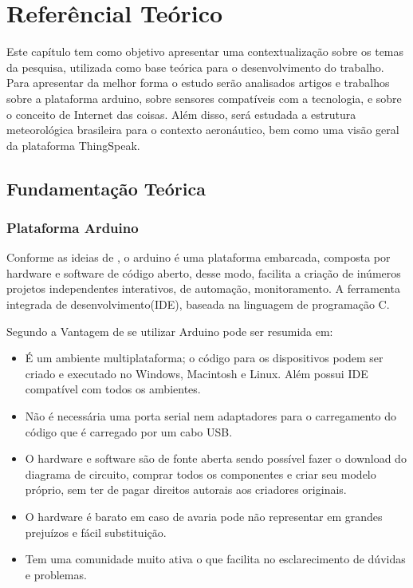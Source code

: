 \chapter{Referêncial Teórico} \label{RevisaoBibliografica}

Este capítulo tem como objetivo apresentar uma contextualização sobre os temas da pesquisa, utilizada como base teórica para o desenvolvimento do trabalho. Para apresentar da melhor forma o estudo serão analisados artigos e trabalhos sobre a plataforma arduino, sobre sensores compatíveis com a tecnologia, e sobre o conceito de Internet das coisas. Além disso, será estudada a estrutura meteorológica brasileira para o contexto aeronáutico, bem como uma visão geral da plataforma ThingSpeak.

\section{Fundamentação Teórica}

\subsection{Plataforma Arduino}

Conforme as ideias de \cite{mcrobertssao}, o arduino é uma plataforma embarcada, composta por hardware e software de código aberto, desse modo, facilita a criação de inúmeros projetos independentes interativos, de automação, monitoramento. A ferramenta integrada de desenvolvimento(IDE), baseada na linguagem de programação C. 

Segundo \cite{banzi2011primeiros} a Vantagem de se utilizar Arduino pode ser resumida em:
\begin{itemize} 
    \item É um ambiente multiplataforma; o código para os dispositivos podem ser criado e executado no Windows, Macintosh e Linux. Além possui IDE compatível com todos os ambientes.
    \item Não é necessária uma porta serial nem adaptadores para o carregamento do código que é carregado por um cabo USB.
    \item  O hardware e software são de fonte aberta sendo possível fazer o download do diagrama de circuito, comprar todos os componentes e criar seu modelo próprio, sem ter de pagar direitos autorais aos criadores originais.
    \item O hardware é barato em caso de avaria pode não representar em grandes prejuízos e fácil substituição.
    \item Tem uma comunidade muito ativa o que facilita no esclarecimento de dúvidas e problemas.
\end{itemize}

